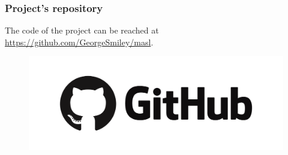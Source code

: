\documentclass[xcolor ={table,usenames,dvipsnames}]{beamer}
\theoremstyle{definition}
\begin{document}
	\begin{frame}[fragile]
		\frametitle{Project's repository}
		The code of the project can be reached at
		 \href{https://github.com/GeorgeSmiley/masl}{https://github.com/GeorgeSmiley/masl}.
		 \begin{figure}[h!]
		 	\centering
		 	\includegraphics[scale=0.08]{img/github.png}
		 \end{figure}
	\end{frame}
	
\end{document}
